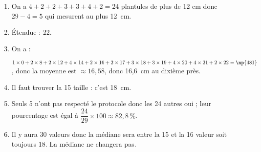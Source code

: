 \begin{enumerate}
\item %
On a $4 + 2 + 2 + 3 + 3 + 4 + 2 = 24$ plantules de plus de 12 cm donc $29 - 4 = 5$ qui mesurent au plus 12~cm.
\item %
Étendue : 22. 
\item %
On a : 

$1\times 0 + 2\times8 + 2\times12 + 4\times14 + 2\times16 + 2\times17 + 3\times18 + 3\times19 + 4\times20 + 4 \times 21 + 2\times 22 = \np{481}$, donc la moyenne est $\approx 16,58$, donc 16,6~cm au dixième près. 
\item %
Il faut trouver la 15 taille : c'est 18~cm. 
\item %
 
Seuls 5 n'ont pas respecté le protocole donc  les 24 autres oui ; leur pourcentage est égal à $\dfrac{24}{29} \times 100 \approx 82,8\,\%$.
\item %
 
Il y aura 30 valeurs donc la médiane sera entre la 15 et la 16 valeur soit toujours 18.
La médiane ne changera pas. 
\end{enumerate}

\bigskip

